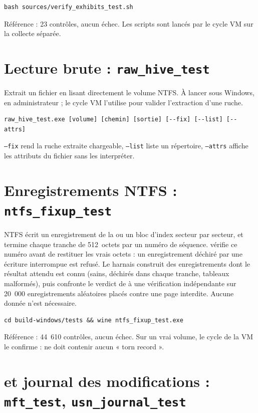 \documentclass[11pt,a4paper,oneside]{report}
\begin{document}
\begin{lstlisting}
bash sources/verify_exhibits_test.sh
\end{lstlisting}

Référence : 23 contrôles, aucun échec. Les scripts  sont lancés
par le cycle VM sur la collecte séparée.

\section{Lecture brute : \texttt{raw\_hive\_test}}

Extrait un fichier en lisant directement le volume NTFS. À lancer sous Windows,
en administrateur ; le cycle VM l'utilise pour valider l'extraction d'une ruche.

\begin{lstlisting}
raw_hive_test.exe [volume] [chemin] [sortie] [--fix] [--list] [--attrs]
\end{lstlisting}

\texttt{--fix} rend la ruche extraite chargeable, \texttt{--list} liste un
répertoire, \texttt{--attrs} affiche les attributs  du fichier
sans les interpréter.

\section{Enregistrements NTFS : \texttt{ntfs\_fixup\_test}}

NTFS écrit un enregistrement de la  ou un bloc d'index
secteur par secteur, et termine chaque tranche de 512~octets par un numéro de
séquence. \wac{} vérifie ce numéro avant de restituer les vrais octets : un
enregistrement déchiré par une écriture interrompue est refusé. Le harnais
construit des enregistrements dont le résultat attendu est connu (sains,
déchirés dans chaque tranche, tableaux malformés), puis confronte le verdict de
\wac{} à une vérification indépendante sur 20~000 enregistrements aléatoires
placés contre une page interdite. Aucune donnée n'est nécessaire.

\begin{lstlisting}
cd build-windows/tests && wine ntfs_fixup_test.exe
\end{lstlisting}

Référence : 44~610 contrôles, aucun échec. Sur un vrai volume, le cycle de la
VM le confirme :  ne doit contenir aucun « torn record ».

\section{ et journal des modifications : \texttt{mft\_test}, \texttt{usn\_journal\_test}}
\end{document}

